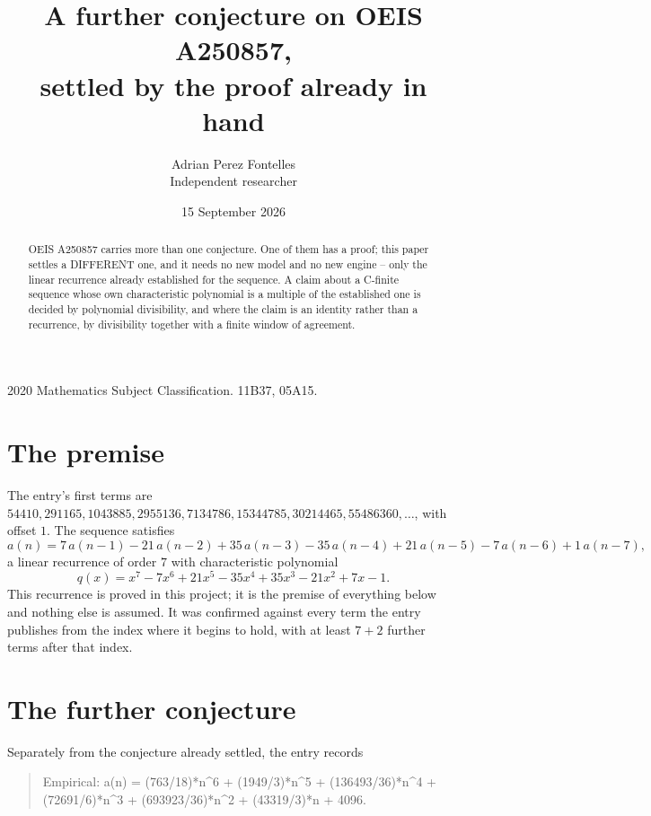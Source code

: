 \documentclass[11pt,a4paper]{article}
\title{A further conjecture on OEIS A250857,\\ \large settled by the proof already in hand}
\author{Adrian Perez Fontelles\\ \small Independent researcher}
\date{15 September 2026}
\theoremstyle{plain}
\theoremstyle{definition}
\begin{document}
\maketitle

\begin{abstract}
OEIS A250857 carries more than one conjecture. One of them has a proof; this paper settles a
DIFFERENT one, and it needs no new model and no new engine -- only the linear recurrence already
established for the sequence. A claim about a C-finite sequence whose own characteristic
polynomial is a multiple of the established one is decided by polynomial divisibility, and where
the claim is an identity rather than a recurrence, by divisibility together with a finite window
of agreement.
\end{abstract}

\noindent\small 2020 Mathematics Subject Classification. 11B37, 05A15.\normalsize

\section{The premise}

The entry's first terms are $54410, 291165, 1043885, 2955136, 7134786, 15344785, 30214465, 55486360,\dots$, with offset $1$. The sequence satisfies
\[
  a(n)=7\,a(n-1) - 21\,a(n-2) + 35\,a(n-3) - 35\,a(n-4) + 21\,a(n-5) - 7\,a(n-6) + 1\,a(n-7) ,
\]
a linear recurrence of order $7$ with characteristic polynomial
\[
  q(x)=x^{7} - 7 x^{6} + 21 x^{5} - 35 x^{4} + 35 x^{3} - 21 x^{2} + 7 x - 1 .
\]
This recurrence is proved in this project; it is the premise of everything below and nothing else is assumed.
It was confirmed against every term the entry publishes from the index where it begins to hold,
with at least $7+2$ further terms after that index.

\section{The further conjecture}

Separately from the conjecture already settled, the entry records

\begin{quote}\raggedright Empirical: a(n) = (763/18)*n\^{}6 + (1949/3)*n\^{}5 + (136493/36)*n\^{}4 + (72691/6)*n\^{}3 + (693923/36)*n\^{}2 + (43319/3)*n + 4096.\end{quote}
\end{document}
